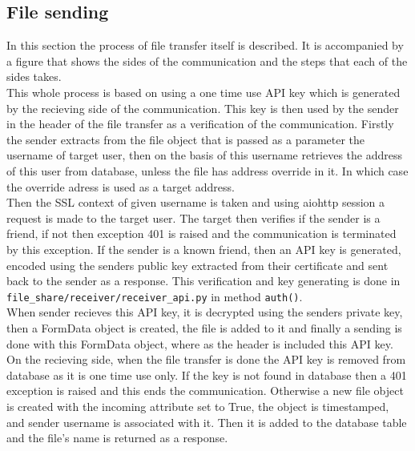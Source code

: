 \subsection{File sending}
In this section the process of file transfer itself is described. It is accompanied by a figure that shows the sides of the communication and the steps
that each of the sides takes.\\
This whole process is based on using a one time use API key which is generated by the recieving side of the communication. This key is then used by the sender in 
the header of the file transfer as a verification of the communication. 
Firstly the sender extracts from the file object that is passed as a parameter the username of target user, then on the basis of this username retrieves the
address of this user from database, unless the file has address override in it. In which case the override adress is used as a target address.\\
Then the SSL context of given username is taken and using aiohttp session a request is made to the target user. The target then verifies if the sender is a friend,
if not then exception 401 is raised and the communication is terminated by this exception. If the sender is a known friend, then an API key is generated, encoded using the senders public 
key extracted from their certificate and sent back to the sender as a response. This verification and key generating is done in \texttt{file\_share/receiver/receiver\_api.py} in method \texttt{auth()}.\\
When sender recieves this API key, it is decrypted using the senders private key, then a FormData object is created, the file is added to it and finally a sending
is done with this FormData object, where as the header is included this API key.\\
On the recieving side, when the file transfer is done the API key is removed from database as it is one time use only. If the key is not found in database then
a 401 exception is raised and this ends the communication. Otherwise a new file object is created with the incoming attribute set to True, the object is timestamped,
and sender username is associated with it. Then it is added to the database table and the file's name is returned as a response.\\

